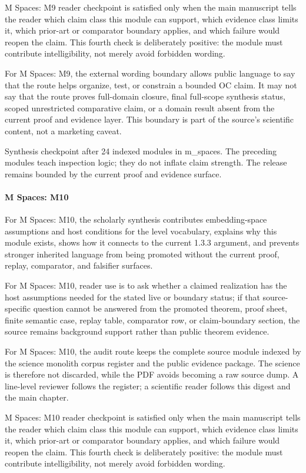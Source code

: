 M Spaces: M9 reader checkpoint is satisfied only when the main manuscript tells the reader which claim class this module can support, which evidence class limits it, which prior-art or comparator boundary applies, and which failure would reopen the claim. This fourth check is deliberately positive: the module must contribute intelligibility, not merely avoid forbidden wording.


For M Spaces: M9, the external wording boundary allows public language to say that the route helps organize, test, or constrain a bounded OC claim. It may not say that the route proves full-domain closure, final full-scope synthesis status, scoped unrestricted comparative claim, or a domain result absent from the current proof and evidence layer. This boundary is part of the source's scientific content, not a marketing caveat.


Synthesis checkpoint after 24 indexed modules in m\_spaces. The preceding modules teach inspection logic; they do not inflate claim strength. The release remains bounded by the current proof and evidence surface.


\paragraph{M Spaces: M10}

For M Spaces: M10, the scholarly synthesis contributes embedding-space assumptions and host conditions for the level vocabulary, explains why this module exists, shows how it connects to the current 1.3.3 argument, and prevents stronger inherited language from being promoted without the current proof, replay, comparator, and falsifier surfaces.


For M Spaces: M10, reader use is to ask whether a claimed realization has the host assumptions needed for the stated live or boundary status; if that source-specific question cannot be answered from the promoted theorem, proof sheet, finite semantic case, replay table, comparator row, or claim-boundary section, the source remains background support rather than public theorem evidence.


For M Spaces: M10, the audit route keeps the complete source module indexed by the science monolith corpus register and the public evidence package. The science is therefore not discarded, while the PDF avoids becoming a raw source dump. A line-level reviewer follows the register; a scientific reader follows this digest and the main chapter.


M Spaces: M10 reader checkpoint is satisfied only when the main manuscript tells the reader which claim class this module can support, which evidence class limits it, which prior-art or comparator boundary applies, and which failure would reopen the claim. This fourth check is deliberately positive: the module must contribute intelligibility, not merely avoid forbidden wording.



